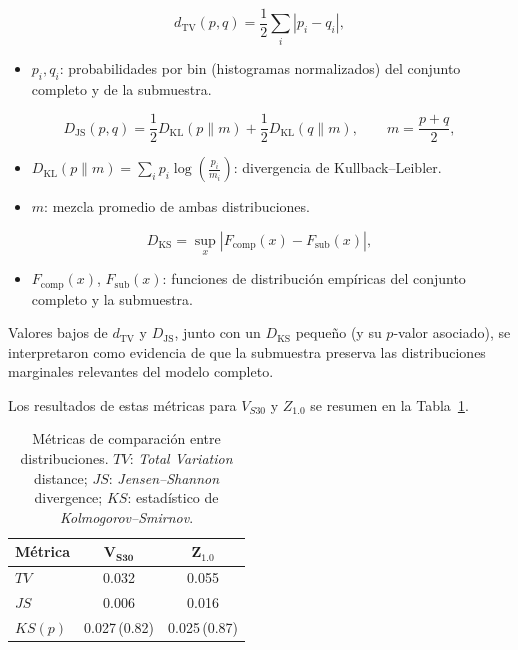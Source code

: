\begin{equation}
d_{\mathrm{TV}}(p,q)=\frac{1}{2}\sum_{i}\left|p_i-q_i\right|,
\label{eq:tv}
\end{equation}
\begin{itemize}
  \item $p_i,q_i$: probabilidades por bin (histogramas normalizados) del conjunto completo y de la submuestra.
\end{itemize}

\begin{equation}
D_{\mathrm{JS}}(p,q)=\frac{1}{2}D_{\mathrm{KL}}(p\|m)+\frac{1}{2}D_{\mathrm{KL}}(q\|m),
\qquad m=\frac{p+q}{2},
\label{eq:js}
\end{equation}
\begin{itemize}
  \item $D_{\mathrm{KL}}(p\|m)=\sum_i p_i\log\!\left(\frac{p_i}{m_i}\right)$: divergencia de Kullback--Leibler.
  \item $m$: mezcla promedio de ambas distribuciones.
\end{itemize}

\begin{equation}
D_{\mathrm{KS}}=\sup_x \left|F_{\mathrm{comp}}(x)-F_{\mathrm{sub}}(x)\right|,
\label{eq:ks}
\end{equation}
\begin{itemize}
  \item $F_{\mathrm{comp}}(x)$, $F_{\mathrm{sub}}(x)$: funciones de distribución empíricas del conjunto completo y la submuestra.
\end{itemize}

Valores bajos de $d_{\mathrm{TV}}$ y $D_{\mathrm{JS}}$, junto con un $D_{\mathrm{KS}}$ pequeño (y su $p$-valor asociado), se interpretaron como evidencia de que la submuestra preserva las distribuciones marginales relevantes del modelo completo.

Los resultados de estas métricas para $V_{S30}$ y $Z_{1.0}$ se resumen en la Tabla~\ref{tab:dist_metrics_subset}.

\begin{table}[H]
\centering
\caption{Métricas de comparación entre distribuciones. $TV$: \textit{Total Variation} distance; $JS$: \textit{Jensen--Shannon} divergence; $KS$: estadístico de \textit{Kolmogorov--Smirnov}.}
\label{tab:dist_metrics_subset}
\small
\begin{tabular}{@{}lcc@{}}
\toprule
\textbf{Métrica} & \(\mathbf{V_{S30}}\) & \(\mathbf{Z_{1.0}}\) \\
\midrule
$TV$ & 0.032 & 0.055 \\
$JS$ & 0.006 & 0.016 \\
$KS(p)$ & 0.027\,(0.82) & 0.025\,(0.87) \\
\bottomrule
\end{tabular}
\end{table}

